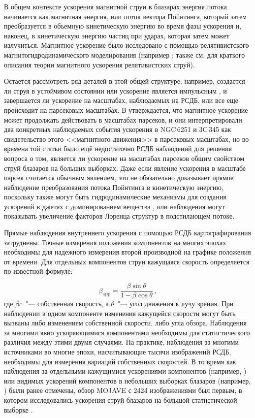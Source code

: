 В общем контексте ускорения магнитной струи в блазарах \cite{Sikora_2005} энергия потока начинается
как магнитная энергия, или поток вектора Пойнтинга, который затем преобразуется в объемную
кинетическую энергию во время фазы ускорения и, наконец, в кинетическую энергию частиц при ударах,
которая затем может излучиться. Магнитное ускорение было исследовано с помощью релятивистского
магнитогидродинамического моделирования (например \cite{McKinney_2006}; также см.
\cite{Komissarov_2011,Konigl_2010} для краткого описания теории магнитного ускорения релятивистских
струй).

Остается рассмотреть ряд деталей в этой общей структуре: например, создается ли струя в устойчивом
состоянии или ускорение является импульсным \cite{Granot_2011,Lyutikov_2010}, и
завершается ли ускорение на масштабах, наблюдаемых на РСДБ, или все еще происходит на
парсековых масштабах. В \cite{Vlahakis_2004} утверждается, что магнитное ускорение может
продолжать действовать в масштабах парсеков, и они интерпретировали два конкретных наблюдаемых
события ускорения в NGC\,6251 и 3C\,345 как свидетельство этого <<магнитного движения>> в
парсековых масштабах, но во времена той статьи было ещё недостаточно РСДБ наблюдений для
решения вопроса о том, является ли ускорение на масштабах парсеков общим свойством струй блазаров
на больших выборках. Даже если явление ускорения в масштабе парсек считается обычным явлением, это
не обязательно доказывает прямое наблюдение преобразования потока Пойнтинга в кинетическую энергию,
поскольку также могут быть гидродинамические механизмы для создания ускорений в джетах с
доминированием вещества \cite{Daly_1988,Kadler_2008}, или наблюдения могут
показывать увеличение факторов Лоренца структур в подстилающем потоке.

Прямые наблюдения внутреннего ускорения с помощью РСДБ картографирования затруднены. Точные
измерения положения компонентов на многих эпохах необходимы для надежного измерения второй
производной на графике положения от времени. Для отдельных компонентов струи кажущаяся скорость
определяется по известной формуле:

\[
 \beta_\text{app} = \frac{\beta \sin\theta}{1 - \beta \cos\theta}\,,
\]
\noindent
где $\beta c$~"--- собственная скорость, а $\theta$~"--- угол движения к лучу зрения. При
наблюдении в
одном компоненте изменения кажущейся скорости могут быть вызваны либо изменением собственной
скорости, либо угла обзора. Наблюдения за многими явно ускоряющимися компонентами необходимы для
статистического различия между этими двумя случаями. На практике, наблюдения за многими источниками
во многие эпохи, насчитывающие тысячи изображений РСДБ, необходимы для измерения вариаций
собственных скоростей. В то время как наблюдения за отдельными кажущимися ускорениями компонентов
(например, \cite{Unwin_1997,Homan_2003}) или видимых ускорений компонентов в небольших выборках
блазаров (например, \cite{Homan_2001,Jorstad_2005}) были ранее отмечены, обзор MOJAVE с 2424
изображениями был первым, в котором исследовались ускорения струй блазаров на большой статистической
выборке \cite{Homan_2009}.

